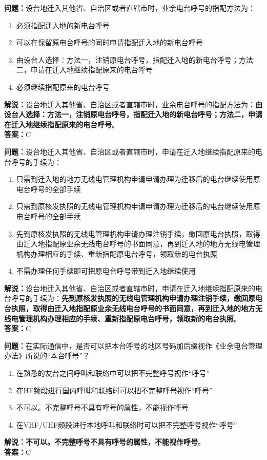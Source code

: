 \documentclass{ctexbook}
\begin{document}
\bigskip


\noindent\textbf{问题：}设台地迁入其他省、自治区或者直辖市时，业余电台呼号的指配方法为：
\begin{enumerate}[label=\Alph*), leftmargin=3em]
	\item 必须指配迁入地的新电台呼号
	\item 可以在保留原电台呼号的同时申请指配迁入地的新电台呼号
	\item 由设台人选择：方法一，注销原电台呼号，指配迁入地的新电台呼号；方法二，申请在迁入地继续指配原来的电台呼号
	\item 必须继续指配原来的电台呼号
\end{enumerate}
\noindent\textbf{解说：}设台地迁入其他省、自治区或者直辖市时，业余电台呼号的指配方法为：\textbf{由设台人选择：方法一，注销原电台呼号，指配迁入地的新电台呼号；方法二，申请在迁入地继续指配原来的电台呼号}。\\\noindent\textbf{答案：}C



\bigskip


\noindent\textbf{问题：}设台地迁入其他省、自治区或者直辖市时，申请在迁入地继续指配原来的电台呼号的手续为：
\begin{enumerate}[label=\Alph*), leftmargin=3em]
	\item 只需到迁入地的地方无线电管理机构申请申请办理为迁移后的电台继续使用原电台呼号的全部手续
	\item 只需到原核发执照的无线电管理机构申请申请办理为迁移后的电台继续使用原电台呼号的全部手续
	\item 先到原核发执照的无线电管理机构申请办理注销手续，缴回原电台执照，取得由迁入地指配原业余无线电台呼号的书面同意，再到迁入地的地方无线电管理机构办理相应的手续、重新指配原电台呼号，领取新的电台执照
	\item 不需办理任何手续即可把原电台呼号带到迁入地继续使用
\end{enumerate}
\noindent\textbf{解说：}设台地迁入其他省、自治区或者直辖市时，申请在迁入地继续指配原来的电台呼号的手续为：\textbf{先到原核发执照的无线电管理机构申请办理注销手续，缴回原电台执照，取得由迁入地指配原业余无线电台呼号的书面同意，再到迁入地的地方无线电管理机构办理相应的手续、重新指配原电台呼号，领取新的电台执照}。\\\noindent\textbf{答案：}C




\bigskip


\noindent\textbf{问题：}在实际通信中，是否可以把本台呼号的地区号码加后缀视作《业余电台管理办法》所说的“本台呼号”？
\begin{enumerate}[label=\Alph*), leftmargin=3em]
	\item 在熟悉的友台之间呼叫和联络中可以把不完整呼号视作“呼号”
	\item 在HF频段进行国内呼叫和联络时可以把不完整呼号视作“呼号”
	\item 不可以。不完整呼号不具有呼号的属性，不能视作呼号
	\item 在VHF/UHF频段进行本地呼叫和联络时可以把不完整呼号视作“呼号”
\end{enumerate}
\textbf{解说：不可以。不完整呼号不具有呼号的属性，不能视作呼号}。\\\noindent\textbf{答案：}C
\end{document}
